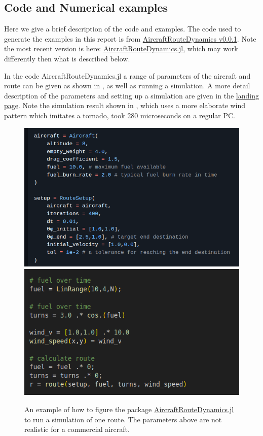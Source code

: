 \documentclass{article}
\begin{document}
\subsection{Code and Numerical examples}
Here we give a brief description of the code \cite{gower2025AircraftRouteDynamics} and examples. The code used to generate the examples in this report is from \href{https://github.com/arturgower/AircraftRouteDynamics.jl/tree/v0.0.1}{AircraftRouteDynamics v0.0.1}. Note the most recent version is here: \href{https://github.com/arturgower/AircraftRouteDynamics.jl/tree/main}{AircraftRouteDynamics.jl}, which may work differently then what is described below.

In the code AircraftRouteDynamics.jl a range of parameters of the aircraft and route can be given as shown in , as well as running a simulation. A more detail description of the parameters and setting up a simulation are given in the \href{https://github.com/arturgower/AircraftRouteDynamics.jl/blob/v0.0.1/README.md}{landing page}. Note the simulation result shown in , which uses a more elaborate wind pattern which imitates a tornado, took 280 microseconds on a regular PC.

\begin{figure}[h]
    \centering
    \includegraphics[width = 0.53\linewidth]{configure-aircraft.png}
    \includegraphics[width = 0.46\linewidth]{run-aircraft.png}
    \caption{An example of how to figure the package \href{https://github.com/arturgower/AircraftRouteDynamics.jl/tree/main}{AircraftRouteDynamics.jl} to run a simulation of one route. The parameters above are not realistic for a commercial aircraft.}
    \label{fig:configure-aircraft}
\end{figure}
\end{document}
